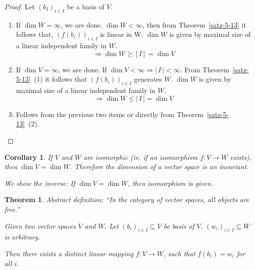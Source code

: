 \documentclass[a4paper,landscape,twocolumn]{article}
\newcommand\card[1]{\left|\,#1\,\right|}
\newtheorem{theorem}{Theorem}
\newtheorem{cor}{Corollary}
\begin{document}
\begin{proof}
  Let $(b_I)_{i \in I}$ be a basis of $V$.
  \begin{enumerate}
    \item
      If $\dim{W} = \infty$, we are done.
      $\dim{W} < \infty$, then from Theorem~\ref{satz-5-13} it follows that,
      $\left(f(b_i)\right)_{i \in I}$ is linear in W.
      $\dim{W}$ is given by maximal size of a linear independent family in $W$.
      \[ \Rightarrow \dim{W} \geq [I] = \dim{V} \]
    \item
      If $\dim{V} = \infty$, we are done.
      If $\dim{V} < \infty \Rightarrow \card{I} < \infty$.
      From Theorem~\ref{satz-5-13}~(1) it follows that
      $\left(f(b_i)\right)_{i \in I}$ generates $W$.
      $\dim{W}$ is given by maximal size of a linear independent family in $W$.
      \[ \Rightarrow \dim{W} \leq \card{I} = \dim{V} \]
    \item
      Follows from the previous two items or directly from Theorem~\ref{satz-5-13}~(2).
  \end{enumerate}
\end{proof}
%
\begin{cor}
  If $V$ and $W$ are isomorphic (ie. if an isomorphism $f: V \rightarrow W$ exists),
  then $\dim{V} = \dim{W}$. Therefore the dimension of a vector space is an invariant.

  We show the inverse: If $\dim{V} = \dim{W}$, then isomorphism is given.
\end{cor}
%
\begin{theorem}
  \label{satz-5-15}
  Abstract definition:
  \enquote{In the category of vector spaces, all objects are free.}

  Given two vector spaces $V$ and $W$. Let $(b_i)_{i \in I} \subseteq V$ be basis of $V$.
  $(w_i)_{i \in I} \subseteq W$ is arbitrary.

  Then there exists a distinct linear mapping $f: V \rightarrow W$, such that $f(b_i) = w_i$ for all $i$.
\end{theorem}
\end{document}
